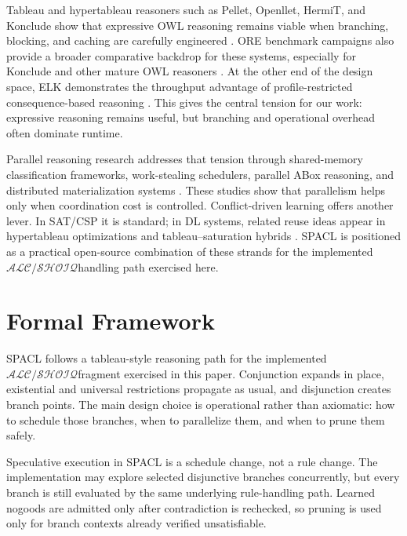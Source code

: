 \documentclass[preprint,12pt,times]{elsarticle}
\newcommand{\dlfrag}{\ensuremath{\mathcal{ALC/SHOIQ}}}
\begin{document}
Tableau and hypertableau reasoners such as Pellet, Openllet, HermiT, and Konclude show that expressive OWL reasoning remains viable when branching, blocking, and caching are carefully engineered \cite{pellet,openllet,hermit,konclude,motik2009hypertableau}. ORE benchmark campaigns also provide a broader comparative backdrop for these systems, especially for Konclude and other mature OWL reasoners \cite{parsia2015ore}. At the other end of the design space, ELK demonstrates the throughput advantage of profile-restricted consequence-based reasoning \cite{elk}. This gives the central tension for our work: expressive reasoning remains useful, but branching and operational overhead often dominate runtime.

Parallel reasoning research addresses that tension through shared-memory classification frameworks, work-stealing schedulers, parallel ABox reasoning, and distributed materialization systems \cite{quan2017parallel,quan2019framework,workstealing,steigmiller2020parallelised,liu2017spowl,gu2015cichlid,benitez2023nora}. These studies show that parallelism helps only when coordination cost is controlled. Conflict-driven learning offers another lever. In SAT/CSP it is standard; in DL systems, related reuse ideas appear in hypertableau optimizations and tableau--saturation hybrids \cite{marques1999grasp,glorian2020nacre,motik2009hypertableau,song2013complete,glimm2014coupling}. SPACL is positioned as a practical open-source combination of these strands for the implemented \dlfrag handling path exercised here.

\section{Formal Framework}
\label{sec:formal}

SPACL follows a tableau-style reasoning path for the implemented \dlfrag fragment exercised in this paper. Conjunction expands in place, existential and universal restrictions propagate as usual, and disjunction creates branch points. The main design choice is operational rather than axiomatic: how to schedule those branches, when to parallelize them, and when to prune them safely.

Speculative execution in SPACL is a schedule change, not a rule change. The implementation may explore selected disjunctive branches concurrently, but every branch is still evaluated by the same underlying rule-handling path. Learned nogoods are admitted only after contradiction is rechecked, so pruning is used only for branch contexts already verified unsatisfiable.
\end{document}
